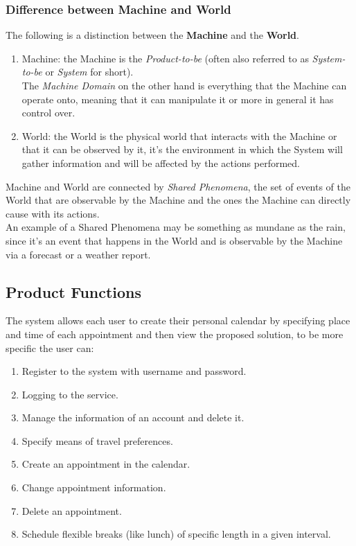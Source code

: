 \subsubsection*{Difference between Machine and World}
The following is a distinction between the \textbf{Machine} and the \textbf{World}.
\begin{enumerate}
\item Machine: the Machine is the \textit{Product-to-be} (often also referred to as \textit{System-to-be} or \emph{System} for short).
\\The \textit{Machine Domain} on the other hand is everything that the Machine can operate onto, meaning that it can manipulate it or more in general it has control over.
\item World: the World is the physical world that interacts with the Machine or that it can be observed by it, it's the environment in which the System will gather information and will be affected by the actions performed.
\end{enumerate}
Machine and World are connected by \textit{Shared Phenomena}, the set of events of the World that are observable by the Machine and the ones the Machine can directly cause with its actions.
\\An example of a Shared Phenomena may be something as mundane as the rain, since it's an event that happens in the World and is observable by the Machine via a forecast or a weather report.
\subsection{Product Functions}
The system allows each user to create their personal calendar by specifying place and time of each appointment and then view the proposed solution, to be more specific the user can:
\begin{enumerate}
\item Register to the system with username and password.
\item Logging to the service.
\item Manage the information of an account and delete it.
\item Specify means of travel preferences.
\item Create an appointment in the calendar.
\item Change appointment information.
\item Delete an appointment.
\item Schedule flexible breaks (like lunch) of specific length in a given interval.
\end{enumerate}
\par
